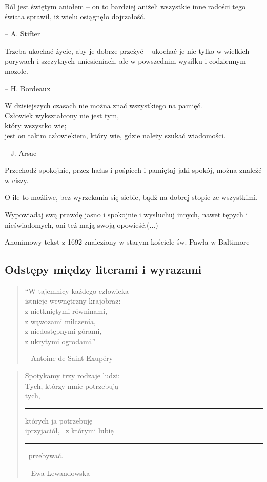 \documentclass[12pt]{article}
\begin{document}
\begin{flushright}
Ból jest świętym aniołem – on to bardziej aniżeli wszystkie inne radości tego świata sprawił, iż wielu osiągnęło dojrzałość.

\hfill -- A. Stifter

Trzeba ukochać życie, aby je dobrze przeżyć – ukochać je nie tylko w wielkich porywach i szczytnych uniesieniach, ale w powszednim wysiłku i codziennym mozole.

\hfill -- H. Bordeaux

W dzisiejszych czasach nie można znać wszystkiego na pamięć.\\
Człowiek wykształcony nie jest tym,\\
który wszystko wie;\\
jest on takim człowiekiem, który wie, gdzie należy szukać wiadomości.

\hfill -- J. Arsac
\end{flushright}

\begin{center}
Przechodź spokojnie, przez hałas i pośpiech i pamiętaj jaki spokój, można znaleźć w ciszy.

O ile to możliwe, bez wyrzekania się siebie, bądź na dobrej stopie ze wszystkimi.

Wypowiadaj swą prawdę jasno i spokojnie i wysłuchuj innych, nawet tępych i nieświadomych, oni też mają swoją opowieść.(...)

Anonimowy tekst z 1692 znaleziony w starym kościele św. Pawła w Baltimore
\end{center}

\subsection{Odstępy między literami i wyrazami}

\begin{quote}
\enquote{W tajemnicy każdego człowieka\\
istnieje wewnętrzny krajobraz:\\
z nietkniętymi równinami,\\
z wąwozami milczenia,\\
z niedostępnymi górami,\\
z ukrytymi ogrodami.}

\hfill -- Antoine de Saint-Exupéry
\end{quote}

\begin{quote}
Spotykamy trzy \hfill rodzaje ludzi:\\
Tych, \dotfill którzy mnie potrzebują\\
tych, \leavevmode\leaders\hrule height 0.4pt\hfill\kern0pt których ja potrzebuję\\
i\hspace{1em}przyjaciół, \dotfill\ z którymi lubię\hspace{1em}%
\rule{1cm}{0.4pt} \dotfill\ przebywać. \dotfill

\hfill -- Ewa Lewandowska
\end{quote}
\end{document}
